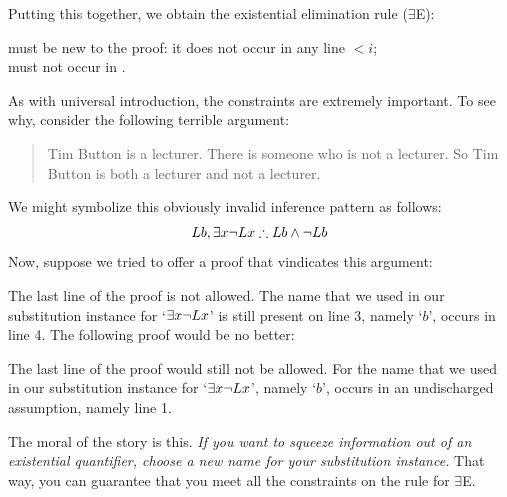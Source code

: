 Putting this together, we obtain the existential elimination rule ($\exists$E):
\begin{highlighted}
\begin{fitchproof}
	\open
		\ellipsesline
	\close
	 
\end{fitchproof}
 must be new to the proof: it does not occur in any line $< i$;\\
 must not occur in \metaY.
\end{highlighted}
As with universal introduction, the constraints are extremely important. To see why, consider the following terrible argument:
	\begin{quote}
		Tim Button is a lecturer. There is someone who is not a lecturer. So Tim Button is both a lecturer and not a lecturer.
	\end{quote}
We might symbolize this obviously invalid inference pattern as follows:
$$Lb, \exists x \enot Lx \therefore Lb \eand \enot Lb$$
Now, suppose we tried to offer a proof that vindicates this argument:
\begin{fitchproof}
	\open
	\close
\end{fitchproof}
The last line of the proof is not allowed. The name that we used in our substitution instance for `$\exists x \neg Lx$' is still present on line 3, namely `$b$', occurs in line 4. The following proof would be no better:
\begin{fitchproof}
	\open
	\close
\end{fitchproof}
The last line of the proof would still not be allowed. For the name that we used in our substitution instance for `$\exists x \neg Lx$', namely `$b$', occurs in an undischarged assumption, namely line 1.

The moral of the story is this. \emph{If you want to squeeze information out of an existential quantifier, choose a new name for your substitution instance.} That way, you can guarantee that you meet all the constraints on the rule for $\exists$E.

